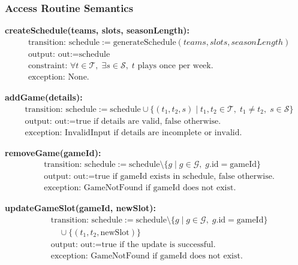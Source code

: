 \documentclass[12pt, titlepage]{article}
\begin{document}
\subsubsection{Access Routine Semantics}

\noindent \textbf{createSchedule(teams, slots, seasonLength):}
\begin{align*}
   & \text{transition: } \text{schedule} := \text{generateSchedule}(teams, slots, seasonLength)                     \\
   & \text{output: } \text{out} := \text{schedule}                                                                  \\
   & \text{constraint: } \forall t \in \mathcal{T}, \; \exists s \in \mathcal{S}, \; t \text{ plays once per week.} \\
   & \text{exception: } \text{None.}
\end{align*}

\vspace{1em}

\noindent \textbf{addGame(details):}
\begin{align*}
   & \text{transition: } \text{schedule} := \text{schedule} \cup \{(t_1, t_2, s) \;|\; t_1, t_2 \in \mathcal{T}, \; t_1 \neq t_2, \; s \in \mathcal{S}\} \\
   & \text{output: } \text{out} := \text{true if details are valid, false otherwise.}                                                                    \\
   & \text{exception: } \text{InvalidInput if details are incomplete or invalid.}
\end{align*}

\vspace{1em}

\noindent \textbf{removeGame(gameId):}
\begin{align*}
   & \text{transition: } \text{schedule} := \text{schedule} \setminus \{g \;|\; g \in \mathcal{G}, \; g.\text{id} = \text{gameId}\} \\
   & \text{output: } \text{out} := \text{true if gameId exists in schedule, false otherwise.}                                       \\
   & \text{exception: } \text{GameNotFound if gameId does not exist.}
\end{align*}

\vspace{1em}

\noindent \textbf{updateGameSlot(gameId, newSlot):}
\begin{align*}
   & \text{transition: } \text{schedule} := \text{schedule} \setminus \{g \;|\; g \in \mathcal{G}, \; g.\text{id} = \text{gameId}\} \\
   & \quad \cup \{(t_1, t_2, \text{newSlot})\}                                                                                      \\
   & \text{output: } \text{out} := \text{true if the update is successful.}                                                         \\
   & \text{exception: } \text{GameNotFound if gameId does not exist.}
\end{align*}
\end{document}
